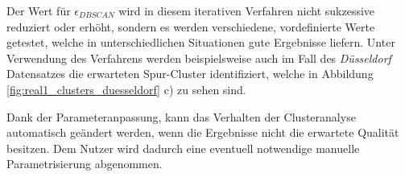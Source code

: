 Der Wert für $\epsilon_{DBSCAN}$ wird in diesem iterativen Verfahren nicht sukzessive reduziert oder erhöht,
sondern es werden verschiedene, vordefinierte Werte getestet, welche in unterschiedlichen Situationen
gute Ergebnisse liefern.
Unter Verwendung des Verfahrens werden beispielsweise auch im Fall des \textit{Düsseldorf} Datensatzes die erwarteten
Spur-Cluster identifiziert, welche in Abbildung \ref{fig:real1_clusters_duesseldorf} c) zu sehen sind.

Dank der Parameteranpassung, kann das Verhalten der Clusteranalyse automatisch geändert werden,
wenn die Ergebnisse nicht die erwartete Qualität besitzen. Dem Nutzer wird dadurch eine eventuell notwendige
manuelle Parametrisierung abgenommen.